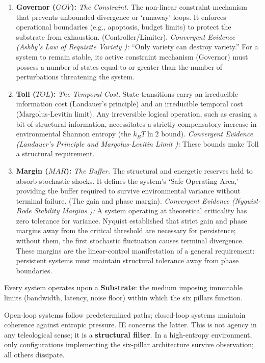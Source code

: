 \begin{enumerate}
    \item \textbf{Governor ($GOV$):} \textit{The Constraint.}
    The non-linear constraint mechanism that prevents unbounded divergence or `runaway' loops. It enforces operational boundaries (e.g., apoptosis, budget limits) to protect the substrate from exhaustion. (Controller/Limiter). 
    \textit{Convergent Evidence (Ashby's Law of Requisite Variety \cite{raadt_ashbys_1987}):} ``Only variety can destroy variety.'' For a system to remain stable, its active constraint mechanism (Governor) must possess a number of states equal to or greater than the number of perturbations threatening the system.
    
    \item \textbf{Toll ($TOL$):} \textit{The Temporal Cost.} State transitions carry an irreducible information cost (Landauer's principle) and an irreducible temporal cost (Margolus-Levitin limit). Any irreversible logical operation, such as erasing a bit of structural information, necessitates a strictly compensatory increase in environmental Shannon entropy (the $k_BT \ln 2$ bound).
    \textit{Convergent Evidence (Landauer's Principle and Margolus-Levitin Limit \cite{landauer_irreversibility_1961,margolus_maximum_1998}):} These bounds make Toll a structural requirement.
   
    \item \textbf{Margin ($MAR$):} \textit{The Buffer.}
    The structural and energetic reserves held to absorb stochastic shocks. It defines the system's `Safe Operating Area,' providing the buffer required to survive environmental variance without terminal failure. (The gain and phase margin). 
    \textit{Convergent Evidence (Nyquist-Bode Stability Margins
    \cite{nyquist_regeneration_1932}):} A system operating at theoretical criticality has zero tolerance for variance. Nyquist established that strict gain and phase margins away from the critical threshold are necessary for persistence; without them, the first stochastic fluctuation causes terminal divergence. These margins are the linear-control manifestation of a general requirement: persistent systems must maintain structural tolerance away from phase boundaries.
\end{enumerate}

Every system operates upon a \textbf{Substrate}: the medium imposing immutable limits (bandwidth, latency, noise floor) within which the six pillars function.

Open-loop systems follow predetermined paths; closed-loop systems maintain coherence against entropic pressure. IE concerns the latter. This is not agency in any teleological sense; it is a \textbf{structural filter}. In a high-entropy environment, only configurations implementing the six-pillar architecture survive observation; all others dissipate.

